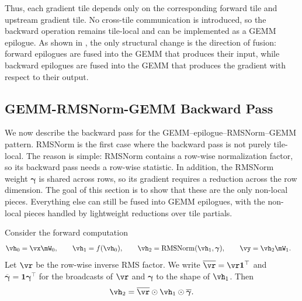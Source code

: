 Thus, each gradient tile depends only on the corresponding forward tile and upstream gradient tile. No cross-tile communication is introduced, so the backward operation remains tile-local and can be implemented as a GEMM epilogue. As shown in , the only structural change is the direction of fusion: forward epilogues are fused into the GEMM that produces their input, while backward epilogues are fused into the GEMM that produces the gradient with respect to their output.

\subsection{GEMM-RMSNorm-GEMM Backward Pass}
\label{sec:backward-rmsnorm-epilogue}

We now describe the backward pass for the GEMM--epilogue--RMSNorm--GEMM pattern. RMSNorm is the first case where the backward pass is not purely tile-local. The reason is simple: RMSNorm contains a row-wise normalization factor, so its backward pass needs a row-wise statistic. In addition, the RMSNorm weight $\boldsymbol{\gamma}$ is shared across rows, so its gradient requires a reduction across the row dimension. The goal of this section is to show that these are the only non-local pieces. Everything else can still be fused into GEMM epilogues, with the non-local pieces handled by lightweight reductions over tile partials.

Consider the forward computation
\begin{align*}
\vh_0 &= \vx \mW_0, \qquad
\vh_1 = f(\vh_0), \qquad
\vh_2 = \operatorname{RMSNorm}(\vh_1, \boldsymbol{\gamma}), \qquad
\vy = \vh_2 \mW_1 .
\end{align*}
Let $\vr$ be the row-wise inverse RMS factor. We write
$\overline{\vr} = \vr \mathbf{1}^{\top}$ and
$\overline{\boldsymbol{\gamma}} = \mathbf{1}\boldsymbol{\gamma}^{\top}$
for the broadcasts of $\vr$ and $\boldsymbol{\gamma}$ to the shape of $\vh_1$. Then
\begin{align*}
\vh_2
=
\overline{\vr} \odot \vh_1 \odot \overline{\boldsymbol{\gamma}} .
\end{align*}

